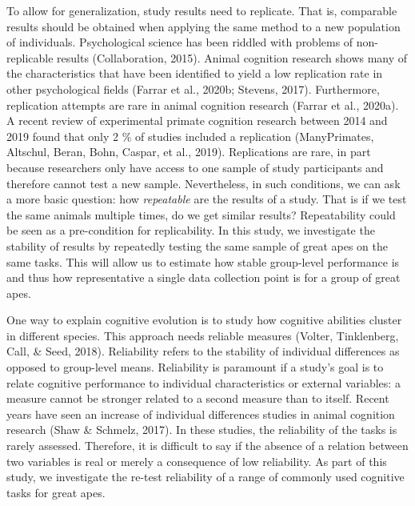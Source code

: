 \documentclass[10pt, letterpaper]{article}
\begin{document}
To allow for generalization, study results need to replicate. That is,
comparable results should be obtained when applying the same method to a
new population of individuals. Psychological science has been riddled
with problems of non-replicable results (Collaboration, 2015). Animal
cognition research shows many of the characteristics that have been
identified to yield a low replication rate in other psychological fields
(Farrar et al., 2020b; Stevens, 2017). Furthermore, replication attempts
are rare in animal cognition research (Farrar et al., 2020a). A recent
review of experimental primate cognition research between 2014 and 2019
found that only 2 \% of studies included a replication (ManyPrimates,
Altschul, Beran, Bohn, Caspar, et al., 2019). Replications are rare, in
part because researchers only have access to one sample of study
participants and therefore cannot test a new sample. Nevertheless, in
such conditions, we can ask a more basic question: how \emph{repeatable}
are the results of a study. That is if we test the same animals multiple
times, do we get similar results? Repeatability could be seen as a
pre-condition for replicability. In this study, we investigate the
stability of results by repeatedly testing the same sample of great apes
on the same tasks. This will allow us to estimate how stable group-level
performance is and thus how representative a single data collection
point is for a group of great apes.

One way to explain cognitive evolution is to study how cognitive
abilities cluster in different species. This approach needs reliable
measures (Volter, Tinklenberg, Call, \& Seed, 2018). Reliability refers
to the stability of individual differences as opposed to group-level
means. Reliability is paramount if a study's goal is to relate cognitive
performance to individual characteristics or external variables: a
measure cannot be stronger related to a second measure than to itself.
Recent years have seen an increase of individual differences studies in
animal cognition research (Shaw \& Schmelz, 2017). In these studies, the
reliability of the tasks is rarely assessed. Therefore, it is difficult
to say if the absence of a relation between two variables is real or
merely a consequence of low reliability. As part of this study, we
investigate the re-test reliability of a range of commonly used
cognitive tasks for great apes.
\end{document}
